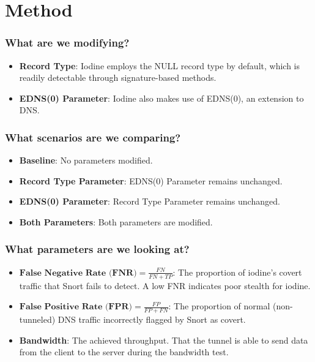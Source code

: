 \documentclass{beamer}
\begin{document}

\section{Method}


\begin{frame}
\frametitle{What are we modifying?}

\begin{itemize}
    \item<1-> \textbf{Record Type}: Iodine employs the NULL record type by default, which is readily detectable through signature-based methods.
    \item<2-> \textbf{EDNS(0) Parameter}: Iodine also makes use of EDNS(0), an extension to DNS.
\end{itemize}
\end{frame}


\begin{frame}
\frametitle{What scenarios are we comparing?}

\begin{itemize}
    \item<1-> \textbf{Baseline}: No parameters modified.
    \item<2-> \textbf{Record Type Parameter}: EDNS(0) Parameter remains unchanged.
    \item<3-> \textbf{EDNS(0) Parameter}: Record Type Parameter remains unchanged.
    \item<4-> \textbf{Both Parameters}: Both parameters are modified.
\end{itemize}
\end{frame}


\begin{frame}
\frametitle{What parameters are we looking at?}

\begin{itemize}
    \item<1-> $\textbf{False Negative Rate (FNR)}= \frac{FN}{FN+TP}$: The proportion of iodine’s covert traffic that Snort fails to detect. A low FNR indicates poor stealth for iodine.
    \item<2-> $\textbf{False Positive Rate (FPR)}= \frac{FP}{FP+FN}$: The proportion of normal (non-tunneled) DNS traffic incorrectly
flagged by Snort as covert.
    \item<3-> \textbf{Bandwidth}: The achieved throughput. That the tunnel is able to send data from the client to the server during the bandwidth test.
\end{itemize}
\end{frame}
\end{document}
